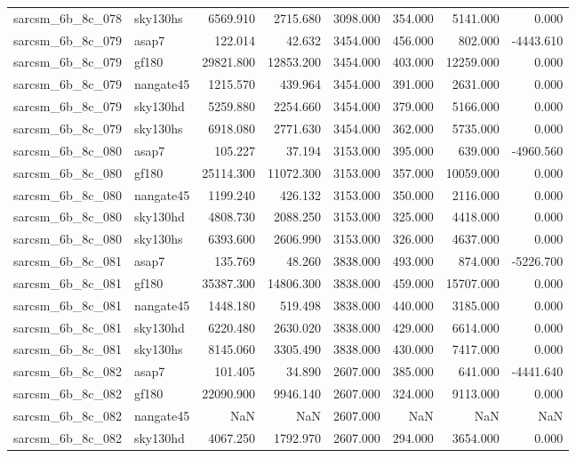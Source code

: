 \begin{tabular}{llrrrrrr}
sarcsm\_6b\_8c\_078 & sky130hs & 6569.910 & 2715.680 & 3098.000 & 354.000 & 5141.000 & 0.000 \\
sarcsm\_6b\_8c\_079 & asap7 & 122.014 & 42.632 & 3454.000 & 456.000 & 802.000 & -4443.610 \\
sarcsm\_6b\_8c\_079 & gf180 & 29821.800 & 12853.200 & 3454.000 & 403.000 & 12259.000 & 0.000 \\
sarcsm\_6b\_8c\_079 & nangate45 & 1215.570 & 439.964 & 3454.000 & 391.000 & 2631.000 & 0.000 \\
sarcsm\_6b\_8c\_079 & sky130hd & 5259.880 & 2254.660 & 3454.000 & 379.000 & 5166.000 & 0.000 \\
sarcsm\_6b\_8c\_079 & sky130hs & 6918.080 & 2771.630 & 3454.000 & 362.000 & 5735.000 & 0.000 \\
sarcsm\_6b\_8c\_080 & asap7 & 105.227 & 37.194 & 3153.000 & 395.000 & 639.000 & -4960.560 \\
sarcsm\_6b\_8c\_080 & gf180 & 25114.300 & 11072.300 & 3153.000 & 357.000 & 10059.000 & 0.000 \\
sarcsm\_6b\_8c\_080 & nangate45 & 1199.240 & 426.132 & 3153.000 & 350.000 & 2116.000 & 0.000 \\
sarcsm\_6b\_8c\_080 & sky130hd & 4808.730 & 2088.250 & 3153.000 & 325.000 & 4418.000 & 0.000 \\
sarcsm\_6b\_8c\_080 & sky130hs & 6393.600 & 2606.990 & 3153.000 & 326.000 & 4637.000 & 0.000 \\
sarcsm\_6b\_8c\_081 & asap7 & 135.769 & 48.260 & 3838.000 & 493.000 & 874.000 & -5226.700 \\
sarcsm\_6b\_8c\_081 & gf180 & 35387.300 & 14806.300 & 3838.000 & 459.000 & 15707.000 & 0.000 \\
sarcsm\_6b\_8c\_081 & nangate45 & 1448.180 & 519.498 & 3838.000 & 440.000 & 3185.000 & 0.000 \\
sarcsm\_6b\_8c\_081 & sky130hd & 6220.480 & 2630.020 & 3838.000 & 429.000 & 6614.000 & 0.000 \\
sarcsm\_6b\_8c\_081 & sky130hs & 8145.060 & 3305.490 & 3838.000 & 430.000 & 7417.000 & 0.000 \\
sarcsm\_6b\_8c\_082 & asap7 & 101.405 & 34.890 & 2607.000 & 385.000 & 641.000 & -4441.640 \\
sarcsm\_6b\_8c\_082 & gf180 & 22090.900 & 9946.140 & 2607.000 & 324.000 & 9113.000 & 0.000 \\
sarcsm\_6b\_8c\_082 & nangate45 & NaN & NaN & 2607.000 & NaN & NaN & NaN \\
sarcsm\_6b\_8c\_082 & sky130hd & 4067.250 & 1792.970 & 2607.000 & 294.000 & 3654.000 & 0.000 \\

\end{tabular}
